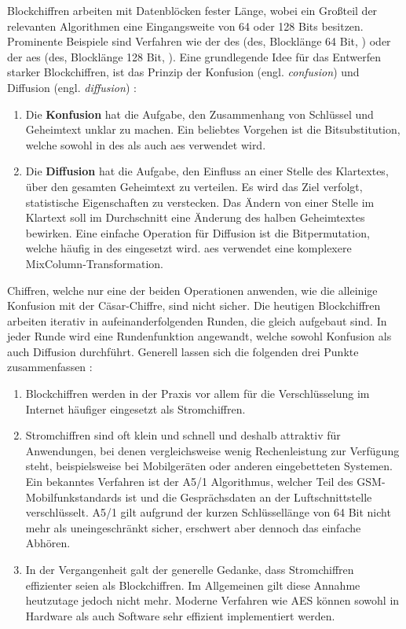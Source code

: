\noindent
Blockchiffren arbeiten mit Datenblöcken fester Länge, wobei ein Großteil der
relevanten Algorithmen eine Eingangsweite von 64 oder 128 Bits besitzen.
Prominente Beispiele sind Verfahren wie der \acl{des}
(\acs{des}, Blocklänge 64 Bit, \cite[55-58]{BOOK:crypto}) oder der \acl{aes}
(\acs{des}, Blocklänge 128 Bit, \cite[87-90]{BOOK:crypto}).
Eine grundlegende Idee für das Entwerfen starker Blockchiffren, ist das Prinzip
der Konfusion (engl. \textit{confusion}) und
Diffusion (engl. \textit{diffusion}) \parencite[57]{BOOK:crypto}:
\begin{enumerate}
  \item Die \textbf{Konfusion} hat die Aufgabe, den
        Zusammenhang von Schlüssel und Geheimtext unklar zu machen. Ein
        beliebtes Vorgehen ist die Bitsubstitution, welche sowohl in \acs{des} als auch
        \acs{aes} verwendet wird.
  \item Die \textbf{Diffusion} hat die Aufgabe, den Einfluss
        an einer Stelle des Klartextes, über den gesamten Geheimtext zu verteilen. Es wird
        das Ziel verfolgt, statistische Eigenschaften zu verstecken.
        Das Ändern von einer Stelle im Klartext
        soll im Durchschnitt eine Änderung des halben Geheimtextes bewirken. Eine einfache
        Operation für Diffusion ist die Bitpermutation, welche häufig in \acs{des} eingesetzt wird.
        \acs{aes} verwendet eine komplexere MixColumn-Transformation.
\end{enumerate}
Chiffren, welche nur eine der beiden Operationen anwenden, wie die alleinige Konfusion
mit der Cäsar-Chiffre, sind nicht sicher. Die heutigen Blockchiffren
arbeiten iterativ in aufeinanderfolgenden Runden, die gleich aufgebaut sind. In jeder Runde wird eine
Rundenfunktion angewandt, welche sowohl Konfusion als auch Diffusion durchführt.
Generell lassen sich die folgenden drei Punkte zusammenfassen \parencite[31]{BOOK:crypto}:

\begin{enumerate}
  \item Blockchiffren werden in der Praxis vor allem für die Verschlüsselung im Internet
        häufiger eingesetzt als Stromchiffren.
  \item Stromchiffren sind oft klein und schnell und deshalb attraktiv für Anwendungen,
        bei denen vergleichsweise wenig Rechenleistung zur Verfügung steht, beispielsweise bei
        Mobilgeräten oder anderen eingebetteten Systemen. Ein bekanntes Verfahren ist der
        A5/1 Algorithmus, welcher Teil des GSM-Mobilfunkstandards ist und die Gesprächsdaten
        an der Luftschnittstelle verschlüsselt. A5/1 gilt aufgrund der kurzen Schlüssellänge von
        64 Bit nicht mehr als uneingeschränkt sicher, erschwert aber dennoch das einfache Abhören.
  \item In der Vergangenheit galt der generelle Gedanke, dass Stromchiffren
        effizienter seien als Blockchiffren.
        Im Allgemeinen gilt diese Annahme heutzutage jedoch nicht mehr. Moderne Verfahren wie AES
        können sowohl in Hardware als auch Software sehr effizient implementiert werden.
\end{enumerate}

